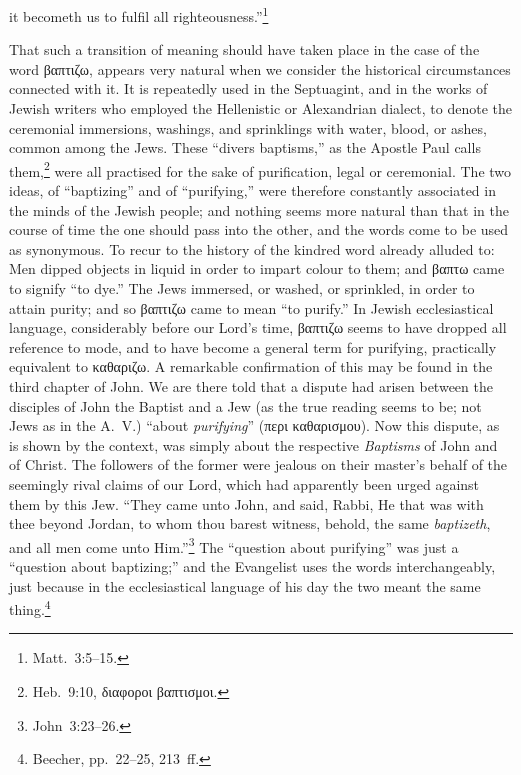 \documentclass[
  english,
]{book}
\newcommand{\textgreek}[2][]{\foreignlanguage{greek}{#2}}
\begin{document}
it becometh us to fulfil all righteousness.''\footnote{Matt.~3:5--15.}

That such a transition of meaning should have taken place in the case of the word \textgreek{βαπτιζω}, appears very natural when we consider the historical circumstances connected with it. It is repeatedly used in the Septuagint, and in the works of Jewish writers who employed the Hellenistic or Alexandrian dialect, to denote the ceremonial immersions, washings, and sprinklings with water, blood, or ashes, common among the Jews. These ``divers baptisms,'' as the Apostle Paul calls them,\footnote{Heb.~9:10, \textgreek{διαφοροι βαπτισμοι}.} were all practised for the sake of purification, legal or ceremonial. The two ideas, of ``baptizing'' and of ``purifying,'' were therefore constantly associated in the minds of the Jewish people; and nothing seems more natural than that in the course of time the one should pass into the other, and the words come to be used as synonymous. To recur to the history of the kindred word already alluded to: Men dipped objects in liquid in order to impart colour to them; and \textgreek{βαπτω} came to signify ``to dye.'' The Jews immersed, or washed, or sprinkled, in order to attain purity; and so \textgreek{βαπτιζω} came to mean ``to purify.'' In Jewish ecclesiastical language, considerably before our Lord's time, \textgreek{βαπτιζω} seems to have dropped all reference to mode, and to have become a general term for purifying, practically equivalent to \textgreek{καθαριζω}. A remarkable confirmation of this may be found in the third chapter of John. We are there told that a dispute had arisen between the disciples of John the Baptist and a Jew (as the true reading seems to be; not Jews as in the A.~V.) ``about \emph{purifying}'' (\textgreek{περι καθαρισμου}). Now this dispute, as is shown by the context, was simply about the respective \emph{Baptisms} of John and of Christ. The followers of the former were jealous on their master's behalf of the seemingly rival claims of our Lord, which had apparently been urged against them by this Jew. ``They came unto John, and said, Rabbi, He that was with thee beyond Jordan, to whom thou barest witness, behold, the same \emph{baptizeth}, and all men come unto Him.''\footnote{John~3:23--26.} The ``question about purifying'' was just a ``question about baptizing;'' and the Evangelist uses the words interchangeably, just because in the ecclesiastical language of his day the two meant the same thing.\footnote{Beecher, pp.~22--25, 213~ff.}
\end{document}
